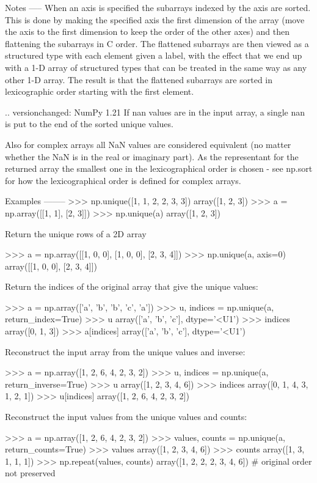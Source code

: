 \begin{DoxyVerb}
Notes
-----
When an axis is specified the subarrays indexed by the axis are sorted.
This is done by making the specified axis the first dimension of the array
(move the axis to the first dimension to keep the order of the other axes)
and then flattening the subarrays in C order. The flattened subarrays are
then viewed as a structured type with each element given a label, with the
effect that we end up with a 1-D array of structured types that can be
treated in the same way as any other 1-D array. The result is that the
flattened subarrays are sorted in lexicographic order starting with the
first element.

.. versionchanged: NumPy 1.21
    If nan values are in the input array, a single nan is put
    to the end of the sorted unique values.

    Also for complex arrays all NaN values are considered equivalent
    (no matter whether the NaN is in the real or imaginary part).
    As the representant for the returned array the smallest one in the
    lexicographical order is chosen - see np.sort for how the lexicographical
    order is defined for complex arrays.

Examples
--------
>>> np.unique([1, 1, 2, 2, 3, 3])
array([1, 2, 3])
>>> a = np.array([[1, 1], [2, 3]])
>>> np.unique(a)
array([1, 2, 3])

Return the unique rows of a 2D array

>>> a = np.array([[1, 0, 0], [1, 0, 0], [2, 3, 4]])
>>> np.unique(a, axis=0)
array([[1, 0, 0], [2, 3, 4]])

Return the indices of the original array that give the unique values:

>>> a = np.array(['a', 'b', 'b', 'c', 'a'])
>>> u, indices = np.unique(a, return_index=True)
>>> u
array(['a', 'b', 'c'], dtype='<U1')
>>> indices
array([0, 1, 3])
>>> a[indices]
array(['a', 'b', 'c'], dtype='<U1')

Reconstruct the input array from the unique values and inverse:

>>> a = np.array([1, 2, 6, 4, 2, 3, 2])
>>> u, indices = np.unique(a, return_inverse=True)
>>> u
array([1, 2, 3, 4, 6])
>>> indices
array([0, 1, 4, 3, 1, 2, 1])
>>> u[indices]
array([1, 2, 6, 4, 2, 3, 2])

Reconstruct the input values from the unique values and counts:

>>> a = np.array([1, 2, 6, 4, 2, 3, 2])
>>> values, counts = np.unique(a, return_counts=True)
>>> values
array([1, 2, 3, 4, 6])
>>> counts
array([1, 3, 1, 1, 1])
>>> np.repeat(values, counts)
array([1, 2, 2, 2, 3, 4, 6])    # original order not preserved\end{DoxyVerb}
 

